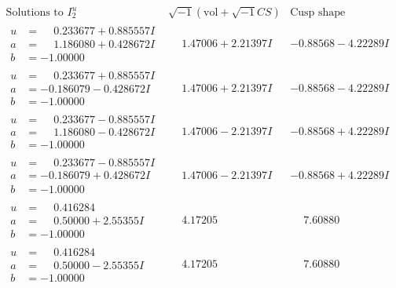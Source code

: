 \documentclass[1p]{elsarticle_modified}
\theoremstyle{definition}
\newcommand{\I}{\sqrt{-1}}
\begin{document}
$$\begin{array}{c|c|c}  
\text{Solutions to }I^u_{2}& \I (\text{vol} + \sqrt{-1}CS) & \text{Cusp shape}\\
 \hline 
\begin{aligned}
u &= \phantom{-}0.233677 + 0.885557 I \\
a &= \phantom{-}1.186080 + 0.428672 I \\
b &= -1.00000\phantom{ +0.000000I}\end{aligned}
 & \phantom{-}1.47006 + 2.21397 I & -0.88568 - 4.22289 I \\ \hline\begin{aligned}
u &= \phantom{-}0.233677 + 0.885557 I \\
a &= -0.186079 - 0.428672 I \\
b &= -1.00000\phantom{ +0.000000I}\end{aligned}
 & \phantom{-}1.47006 + 2.21397 I & -0.88568 - 4.22289 I \\ \hline\begin{aligned}
u &= \phantom{-}0.233677 - 0.885557 I \\
a &= \phantom{-}1.186080 - 0.428672 I \\
b &= -1.00000\phantom{ +0.000000I}\end{aligned}
 & \phantom{-}1.47006 - 2.21397 I & -0.88568 + 4.22289 I \\ \hline\begin{aligned}
u &= \phantom{-}0.233677 - 0.885557 I \\
a &= -0.186079 + 0.428672 I \\
b &= -1.00000\phantom{ +0.000000I}\end{aligned}
 & \phantom{-}1.47006 - 2.21397 I & -0.88568 + 4.22289 I \\ \hline\begin{aligned}
u &= \phantom{-}0.416284\phantom{ +0.000000I} \\
a &= \phantom{-}0.50000 + 2.55355 I \\
b &= -1.00000\phantom{ +0.000000I}\end{aligned}
 & \phantom{-}4.17205\phantom{ +0.000000I} & \phantom{-}7.60880\phantom{ +0.000000I} \\ \hline\begin{aligned}
u &= \phantom{-}0.416284\phantom{ +0.000000I} \\
a &= \phantom{-}0.50000 - 2.55355 I \\
b &= -1.00000\phantom{ +0.000000I}\end{aligned}
 & \phantom{-}4.17205\phantom{ +0.000000I} & \phantom{-}7.60880\phantom{ +0.000000I} \\ \hline\begin{aligned}

\end{aligned}
\end{array}$$
\end{document}
